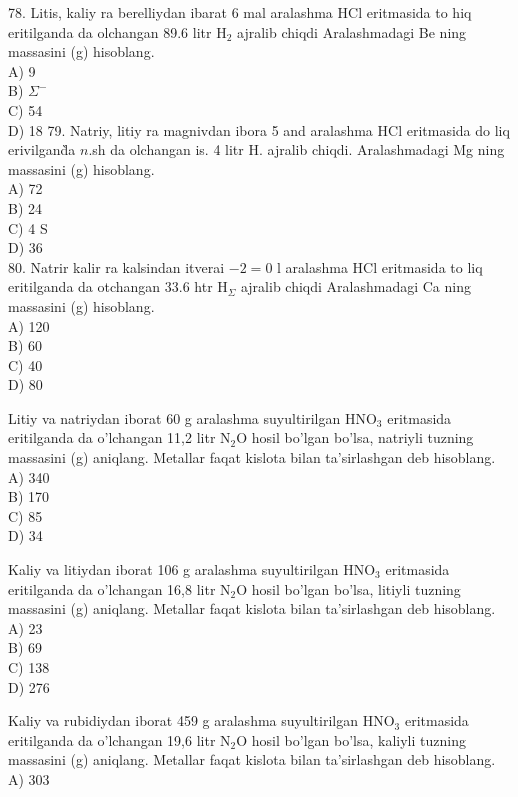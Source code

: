 78. Litis, kaliy ra berelliydan ibarat 6 mal aralashma HCl eritmasida to hiq eritilganda da olchangan 89.6 litr $\mathrm{H}_{2}$ ajralib chiqdi Aralashmadagi Be ning massasini (g) hisoblang.\\
A) 9\\
B) $\Sigma^{-}$\\
C) 54\\
D) 18
79. Natriy, litiy ra magnivdan ibora 5 and aralashma HCl eritmasida do liq erivilgand̀a $n$.sh da olchangan is. 4 litr H. ajralib chiqdi. Aralashmadagi Mg ning massasini (g) hisoblang.\\
A) 72\\
B) 24\\
C) 4 S\\
D) 36\\
80. Natrir kalir ra kalsindan itverai $-2=0$ l aralashma HCl eritmasida to liq eritilganda da otchangan 33.6 htr $\mathrm{H}_{\Sigma}$ ajralib chiqdi Aralashmadagi Ca ning massasini (g) hisoblang.\\
A) 120\\
B) 60\\
C) 40\\
D) 80
  \item Litiy va natriydan iborat 60 g aralashma suyultirilgan $\mathrm{HNO}_{3}$ eritmasida eritilganda da o'lchangan 11,2 litr $\mathrm{N}_{2} \mathrm{O}$ hosil bo'lgan bo'lsa, natriyli tuzning massasini (g) aniqlang. Metallar faqat kislota bilan ta'sirlashgan deb hisoblang.\\
A) 340\\
B) 170\\
C) 85\\
D) 34
  \item Kaliy va litiydan iborat 106 g aralashma suyultirilgan $\mathrm{HNO}_{3}$ eritmasida eritilganda da o'lchangan 16,8 litr $\mathrm{N}_{2} \mathrm{O}$ hosil bo'lgan bo'lsa, litiyli tuzning massasini (g) aniqlang. Metallar faqat kislota bilan ta'sirlashgan deb hisoblang.\\
A) 23\\
B) 69\\
C) 138\\
D) 276
  \item Kaliy va rubidiydan iborat 459 g aralashma suyultirilgan $\mathrm{HNO}_{3}$ eritmasida eritilganda da o'lchangan 19,6 litr $\mathrm{N}_{2} \mathrm{O}$ hosil bo'lgan bo'lsa, kaliyli tuzning massasini (g) aniqlang. Metallar faqat kislota bilan ta'sirlashgan deb hisoblang.\\
A) 303\\
